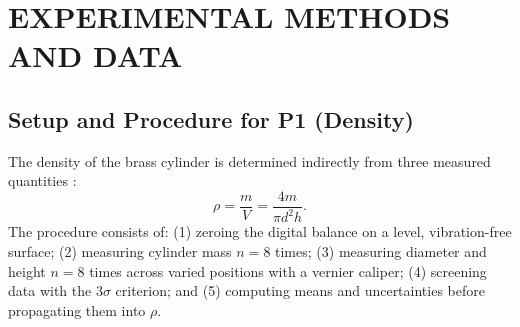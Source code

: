 \documentclass[a4paper, 12pt]{article}
\begin{document}
\section{EXPERIMENTAL METHODS AND DATA}
        \subsection{Setup and Procedure for P1 (Density)}
        The density of the brass cylinder is determined indirectly from three measured quantities \parencite{HallidayResnickWalker}:
        \begin{equation}
            \rho=\frac{m}{V}=\frac{4m}{\pi d^{2}h}.
            \label{eq:rho}
        \end{equation}
        The procedure consists of: (1) zeroing the digital balance on a level, vibration-free surface; (2) measuring cylinder mass $n=8$ times; (3) measuring diameter and height $n=8$ times across varied positions with a vernier caliper; (4) screening data with the $3\sigma$ criterion; and (5) computing means and uncertainties before propagating them into $\rho$.
\end{document}
